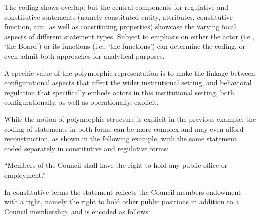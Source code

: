 
\sp

The coding shows overlap, but the central components for regulative and constitutive statements (namely constituted entity, attributes, constitutive function, aim, as well as constituting properties) showcase the varying focal aspects of different statement types. Subject to emphasis on either the actor (i.e., `the Board') or its functions (i.e., `the functions') can determine the coding, or even admit both approaches for analytical purposes.

A specific value of the polymorphic representation is to make the linkage between configurational aspects that affect the wider institutional setting, and behavioral regulation that specifically embeds actors in this institutional setting, both configurationally, as well as operationally, explicit.

While the notion of polymorphic structure is explicit in the previous example, the coding of statements in both forms can be more complex and may even afford reconstruction, as shown in the following example, with the same statement coded separately in constitutive and regulative forms: \begin{exi}``Members of the Council shall have the right to hold any public office or employment.''\end{exi}

In constitutive terms the statement reflects the Council members endowment with a right, namely the right to hold other public positions in addition to a Council membership, and is encoded as follows: 

